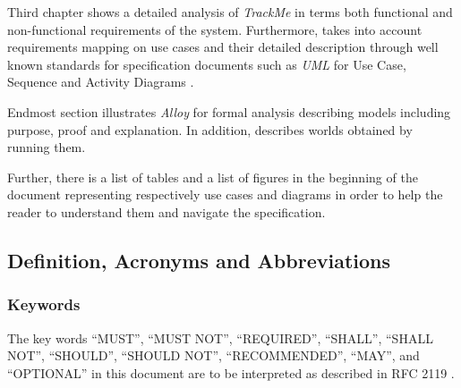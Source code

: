 \documentclass[a4paper]{article}
\begin{document}
        Third chapter shows a detailed analysis of \textit{TrackMe} in terms both functional and non-functional requirements of the system. Furthermore, takes into account requirements mapping on use cases and their detailed description through well known standards for specification documents such as \textit{UML} for Use Case, Sequence and Activity Diagrams \cite{rumbaugh2004unified}.
        
        Endmost section illustrates \textit{Alloy} for formal analysis \cite{jackson2006software} describing models including purpose, proof and explanation. In addition, describes worlds obtained by running them.
        
        Further, there is a list of tables and a list of figures in the beginning of the document representing respectively use cases and diagrams in order to help the reader to understand them and navigate the specification.
        
    \subsection{Definition, Acronyms and  Abbreviations}
            \subsubsection{Keywords}
            The key words “MUST”, “MUST NOT”, “REQUIRED”, “SHALL”, “SHALL NOT”, “SHOULD”, “SHOULD NOT”, “RECOMMENDED”, “MAY”, and “OPTIONAL” in this document are to be interpreted as described in RFC 2119 \cite{bradner1997key}.
\end{document}
